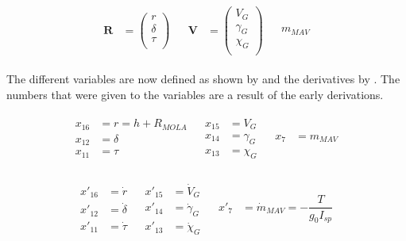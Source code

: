 \begin{align} \label{eq:spherVecDef}
\begin{split}
\mathbf{R} &= 
\begin{pmatrix}
r \\
\delta \\
\tau \\
\end{pmatrix}
\end{split}
&
\begin{split}
\mathbf{V} &= 
\begin{pmatrix}
V_{G} \\
\gamma_{G} \\
\chi_{G} \\
\end{pmatrix}
\end{split}
&
\begin{split}
m_{MAV}
\end{split}
\end{align}

\noindent
The different variables are now defined as shown by  and the derivatives by . The numbers that were given to the variables are a result of the early derivations.

\begin{align} \label{eq:spherVar}
\begin{split}
x_{16} &= r = h+R_{MOLA} \\
x_{12} &= \delta \\
x_{11} &= \tau \\
\end{split}
&
\begin{split}
x_{15} &= V_{G} \\
x_{14} &= \gamma_{G} \\
x_{13} &= \chi_{G} \\
\end{split}
&
\begin{split}
x_{7} &= m_{MAV} \\
\end{split}
\end{align}

\begin{align} \label{eq:spherVarD}
\begin{split}
x'_{16} &= \dot{r} \\
x'_{12} &= \dot{\delta} \\
x'_{11} &= \dot{\tau} \\
\end{split}
&
\begin{split}
x'_{15} &= \dot{V}_{G} \\
x'_{14} &= \dot{\gamma}_{G} \\
x'_{13} &= \dot{\chi}_{G} \\
\end{split}
&
\begin{split}
x'_{7} &= \dot{m}_{MAV} = -\dfrac{T}{g_{0}I_{sp}} \\
\end{split}
\end{align}

